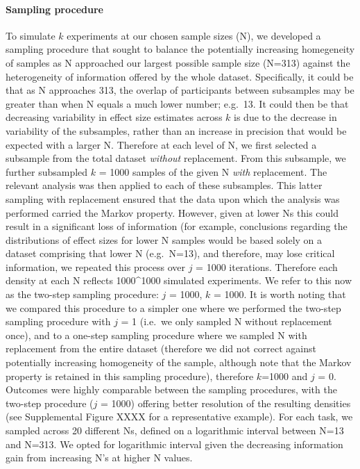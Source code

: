 \documentclass[
  12pt,
]{article}
\begin{document}
\hypertarget{sampling-procedure}{%
\paragraph{Sampling procedure}\label{sampling-procedure}}

To simulate \(k\) experiments at our chosen sample sizes (N), we developed a sampling procedure that sought to balance the potentially increasing homegeneity of samples as N approached our largest possible sample size (N=313) against the heterogeneity of information offered by the whole dataset. Specifically, it could be that as N approaches 313, the overlap of participants between subsamples may be greater than when N equals a much lower number; e.g.~13. It could then be that decreasing variability in effect size estimates across \(k\) is due to the decrease in variability of the subsamples, rather than an increase in precision that would be expected with a larger N. Therefore at each level of N, we first selected a subsample from the total dataset \emph{without} replacement. From this subsample, we further subsampled \(k\) = 1000 samples of the given N \emph{with} replacement. The relevant analysis was then applied to each of these subsamples. This latter sampling with replacement ensured that the data upon which the analysis was performed carried the Markov property. However, given at lower Ns this could result in a significant loss of information (for example, conclusions regarding the distributions of effect sizes for lower N samples would be based solely on a dataset comprising that lower N (e.g.~N=13), and therefore, may lose critical information, we repeated this process over \(j\) = 1000 iterations. Therefore each density at each N reflects 1000\^{}1000 simulated experiments. We refer to this now as the two-step sampling procedure: \(j\) = 1000, \(k\) = 1000. It is worth noting that we compared this procedure to a simpler one where we performed the two-step sampling procedure with \(j\) = 1 (i.e.~we only sampled N without replacement once), and to a one-step sampling procedure where we sampled N with replacement from the entire dataset (therefore we did not correct against potentially increasing homogeneity of the sample, although note that the Markov property is retained in this sampling procedure), therefore \(k\)=1000 and \(j\) = 0. Outcomes were highly comparable between the sampling procedures, with the two-step procedure (\(j\) = 1000) offering better resolution of the resulting densities (see Supplemental Figure XXXX for a representative example). For each task, we sampled across 20 different Ns, defined on a logarithmic interval between N=13 and N=313. We opted for logarithmic interval given the decreasing information gain from increasing N's at higher N values.
\end{document}
